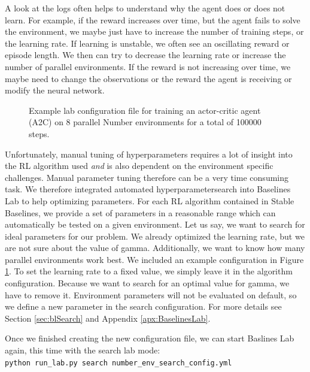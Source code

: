 A look at the logs often helps to understand why the agent does or does not learn. For example, if the reward increases over time, but the agent fails to solve the environment, we maybe just have to increase the number of training steps, or the learning rate. If learning is unstable, we often see an oscillating reward or episode length. We then can try to decrease the learning rate or increase the number of parallel environments. If the reward is not increasing over time, we maybe need to change the observations or the reward the agent is receiving or modify the neural network. 

\begin{figure}[ht!]
    
    \caption[Lab Configuration File for the Number Environment]{Example lab configuration file for training an actor-critic agent (A2C) on 8 parallel Number environments for a total of 100000 steps.}
    \label{fig:NumberEnvConfigSearch}
\end{figure}

Unfortunately, manual tuning of hyperparameters requires a lot of insight into the RL algorithm used \textit{and} is also dependent on the environment specific challenges. Manual parameter tuning therefore can be a very time consuming task. We therefore integrated automated hyperparametersearch into Baselines Lab to help optimizing parameters. For each RL algorithm contained in Stable Baselines, we provide a set of parameters in a reasonable range which can automatically be tested on a given environment. Let us say, we want to search for ideal parameters for our problem. We already optimized the learning rate, but we are not sure about the value of gamma. Additionally, we want to know how many parallel environments work best. We included an example configuration in Figure \ref{fig:NumberEnvConfigSearch}. To set the learning rate to a fixed value, we simply leave it in the algorithm configuration. Because we want to search for an optimal value for gamma, we have to remove it. Environment parameters will not be evaluated on default, so we define a new parameter in the search configuration. For more details see Section \ref{sec:blSearch} and Appendix \ref{apx:BaselinesLab}. 

Once we finished creating the new configuration file, we can start Baslines Lab again, this time with the search lab mode: \\

\texttt{python run\_lab.py search number\_env\_search\_config.yml} \\

